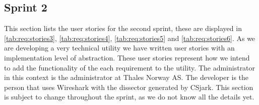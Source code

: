 \subsection{Sprint 2}
\label{sec:req:stories2}
This section lists the user stories for the second sprint, these are displayed in \autoref{tab:req:stories3}, \autoref{tab:req:stories4},
\autoref{tab:req:stories5} and \autoref{tab:req:stories6}.
As we are developing a very technical utility we have written user stories with an implementation level of abstraction. 
These user stories represent how we intend to add the functionality of the each requirement to the utility.
The administrator in this context is the administrator at Thales Norway AS. 
The developer is the person that uses Wireshark with the dissector generated by CSjark.
This section is subject to change throughout the sprint, as we do not know all the details yet.


